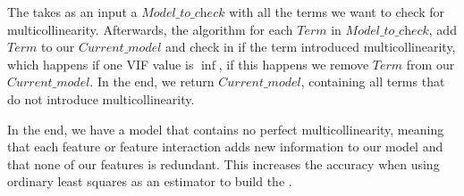 The  takes as an input a $\textit{Model\_to\_check}$ with all the terms we want to check for multicollinearity. 
Afterwards, the algorithm for each $\textit{Term}$ in $\textit{Model\_to\_check}$, 
add $\textit{Term}$ to our $\textit{Current\_model}$ and check in  if the term introduced multicollinearity, 
which happens if one VIF value is $\inf$, if this happens we remove $\textit{Term}$ from our $\textit{Current\_model}$. 
In the end, we return $\textit{Current\_model}$, containing all terms that do not introduce multicollinearity.

In the end, we have a model that contains no perfect multicollinearity, 
meaning that each feature or feature interaction adds new information to our model and that none of our features is redundant. 
This increases the accuracy when using ordinary least squares as an estimator to build the \perfInfluenceModel.